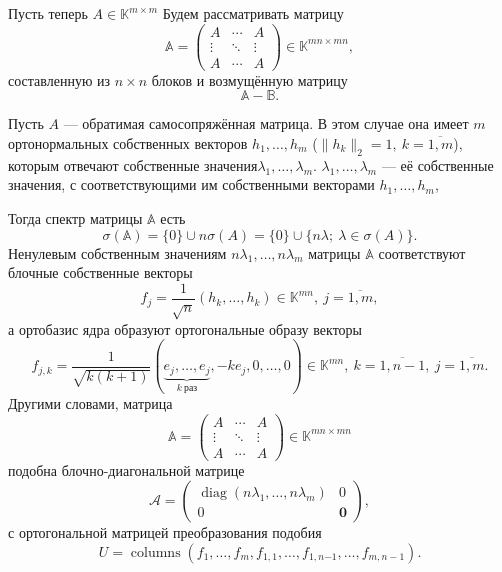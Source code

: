 Пусть теперь \( A\in \mathbb{K}^{m\times m} \)
Будем рассматривать матрицу
\[
    \mathbb{A} =
    \begin{pmatrix}
        A      & \cdots & A \\
        \vdots & \ddots & \vdots \\
        A      & \cdots & A
    \end{pmatrix}
    \in \mathbb{K}^{mn{\times}mn},
    \]
    составленную из \( n\times n \) блоков
    и возмущённую матрицу
\[
    \mathbb{A} - \mathbb{B}.
    \]

\begin{ksvlem}
    Пусть \( A \) --- обратимая самосопряжённая матрица.
    В этом случае она имеет \( m \) ортонормальных
    собственных векторов \( h_1, \ldots, h_m \)
    (\( \|h_k\|_2=1,\ k{=}\overline{1,m} \)),
    которым отвечают собственные значения\( \lambda_1, \ldots, \lambda_m \).
    \( \lambda_1, \ldots, \lambda_m \)
    --- её собственные значения,
    с соответствующими им собственными векторами
    \( h_1, \ldots, h_m \),

    Тогда спектр матрицы \( \mathbb{A} \) есть
    \[
        \sigma(\mathbb{A}) = \{0\} \cup n\sigma(A)
        = \{ 0 \} \cup \{ n\lambda;\ \lambda\in\sigma(A) \}.
        \]
    Ненулевым собственным значениям \( n\lambda_1, \ldots, n\lambda_m \)
    матрицы \( \mathbb{A} \)
    соответствуют блочные собственные векторы
    \[
        f_j = \frac{1}{\sqrt{n}}(h_k, \ldots, h_k)\in\mathbb{K}^{mn},
        \ j{=}\overline{1,m},
       \]
    а ортобазис ядра образуют ортогональные образу
    векторы
    \[
        f_{j,k} =
        \frac{1}{\sqrt{k(k+1)}}
        (\underbrace{e_j,\ldots,e_j}_{k\ \text{раз}}, -ke_j, 0, \ldots, 0)\in\mathbb{K}^{mn},
        \ k{=}\overline{1,n-1},
        \ j{=}\overline{1,m}.
        \]
    Другими словами, матрица
    \[
        \mathbb{A} = 
        \begin{pmatrix}
            A      & \cdots & A \\
            \vdots & \ddots & \vdots \\
            A      & \cdots & A
        \end{pmatrix}
        \in\mathbb{K}^{mn{\times}mn}
        \]
    подобна блочно-диагональной матрице
    \[
        \mathcal{A} =
        \left(\begin{array}{c|c}
            \operatorname{diag}(n\lambda_1,\ldots,n\lambda_m) & 0 \\ \hline
            0 & \mathbf{0}
        \end{array}\right),
        \]
    с ортогональной матрицей преобразования подобия
    \[
        U = \operatorname{columns}
        \left(f_1, \ldots, f_m, f_{1,1}, \ldots, f_{1,n{-1}}, \ldots, f_{m,n{-}1}\right).
        \]
\end{ksvlem}

